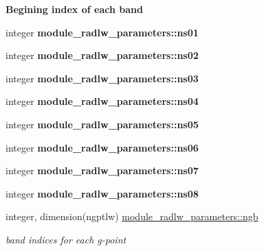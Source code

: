 \begin{Indent}\textbf{ Begining index of each band}\par
\begin{DoxyCompactItemize}
\item 
\mbox{\label{namespacemodule__radlw__parameters_a0f82508bbb4039ebbc3fcb68e8e4e699}} 
integer {\bfseries module\+\_\+radlw\+\_\+parameters\+::ns01}
\item 
\mbox{\label{namespacemodule__radlw__parameters_a8b13d877f08e7c26333285fd1db19d4e}} 
integer {\bfseries module\+\_\+radlw\+\_\+parameters\+::ns02}
\item 
\mbox{\label{namespacemodule__radlw__parameters_a987d257f8e2f0743e92055be94424401}} 
integer {\bfseries module\+\_\+radlw\+\_\+parameters\+::ns03}
\item 
\mbox{\label{namespacemodule__radlw__parameters_a57f85389c924ba16fad61578170eadcc}} 
integer {\bfseries module\+\_\+radlw\+\_\+parameters\+::ns04}
\item 
\mbox{\label{namespacemodule__radlw__parameters_a6bb5413129239f08596d4e7233c666a5}} 
integer {\bfseries module\+\_\+radlw\+\_\+parameters\+::ns05}
\item 
\mbox{\label{namespacemodule__radlw__parameters_ab936172cdf831f0b956c1475f175eca2}} 
integer {\bfseries module\+\_\+radlw\+\_\+parameters\+::ns06}
\item 
\mbox{\label{namespacemodule__radlw__parameters_ac60030c5a4655c6cee7be71dd527ffdc}} 
integer {\bfseries module\+\_\+radlw\+\_\+parameters\+::ns07}
\item 
\mbox{\label{namespacemodule__radlw__parameters_a0a9944341bfe4507370bb6b617ac0476}} 
integer {\bfseries module\+\_\+radlw\+\_\+parameters\+::ns08}
\item 
\mbox{\label{namespacemodule__radlw__parameters_a2c571bd14c9b7982a7968976858c7547}} 
integer, dimension(ngptlw) \hyperlink{namespacemodule__radlw__parameters_a2c571bd14c9b7982a7968976858c7547}{module\+\_\+radlw\+\_\+parameters\+::ngb}
\begin{DoxyCompactList}\small\item\em band indices for each g-\/point \end{DoxyCompactList}\end{DoxyCompactItemize}
\end{Indent}
